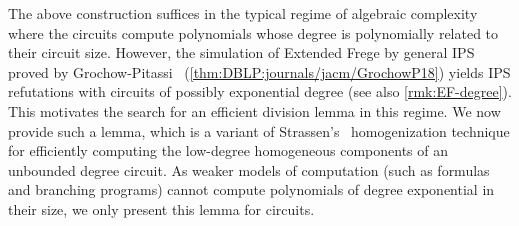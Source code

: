 \documentclass[11pt]{article}
\numberwithin{equation}{section}
\theoremstyle{definition}
\theoremstyle{plain}
\begin{document}
The above construction suffices in the typical regime of algebraic complexity where the circuits compute polynomials whose degree is
%
polynomially related   %
to their circuit size.  However, the simulation of Extended Frege by general IPS proved by Grochow-Pitassi~\cite{DBLP:journals/jacm/GrochowP18} (\autoref{thm:DBLP:journals/jacm/GrochowP18}) yields IPS refutations with circuits of possibly exponential degree (see also \autoref{rmk:EF-degree}).
This motivates the search for an efficient division lemma in this regime.  We now provide such a lemma, which is a variant of Strassen's~\cite{Strassen73} homogenization technique for efficiently computing the low-degree homogeneous components of an unbounded degree circuit.  As weaker models of computation (such as formulas and branching programs) cannot compute polynomials of degree exponential in their size, we only present this lemma for circuits. %
\end{document}
